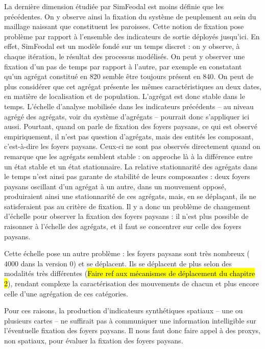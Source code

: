 La dernière dimension étudiée par SimFeodal est moins définie que les précédentes.
On y observe ainsi la fixation du système de peuplement au sein du maillage naissant que constituent les paroisses.
Cette notion de fixation pose problème par rapport à l'ensemble des indicateurs de sortie déployés jusqu'ici.
En effet, SimFeodal est un modèle fondé sur un temps discret :
on y observe, à chaque itération, le résultat des processus modélisés.
On peut y observer une fixation d'un pas de temps par rapport à l'autre, par exemple en constatant qu'un agrégat constitué en 820 semble être toujours présent en 840.
On peut de plus considérer que cet agrégat présente les mêmes caractéristiques au deux dates, en matière de localisation et de population.
L'agrégat est donc stable dans le temps.
L'échelle d'analyse mobilisée dans les indicateurs précédents -- au niveau agrégé des agrégats, voir du système d'agrégats -- pourrait donc s'appliquer ici aussi.
Pourtant, quand on parle de fixation des foyers paysans, ce qui est observé empiriquement, il n'est pas question d'agrégats, mais des entités les composant, c'est-à-dire les foyers paysans.
Ceux-ci ne sont pas observés directement quand on remarque que les agrégats semblent stable :
on approche là à la différence entre un état stable et un état stationnaire.
La relative stationnarité des agrégats dans le temps n'est ainsi pas garante de stabilité de leurs composantes :
deux foyers paysans oscillant d'un agrégat à un autre, dans un mouvement opposé, produiraient ainsi une stationnarité de ces agrégats, mais, en se déplaçant, ils ne satisferaient pas au critère de fixation.
Il y a donc un problème de changement d'échelle pour observer la fixation des foyers paysans :
il n'est plus possible de raisonner à l'échelle des agrégats, et il faut se concentrer sur celle des foyers paysans.

Cette échelle pose un autre problème :
les foyers paysans sont très nombreux ($4000$ dans la version 0) et se déplacent.
Ils se déplacent de plus selon des modalités très différentes (\hl{Faire ref aux mécanismes de déplacement du chapitre 2}), rendant complexe la caractérisation des mouvements de chacun et plus encore celle d'une agrégation de ces catégories.

Pour ces raisons, la production d'indicateurs synthétiques spatiaux -- une ou plusieurs cartes -- ne suffirait pas à communiquer une information intelligible sur l'éventuelle fixation des foyers paysans.
Il nous faut donc faire appel à des \og proxys\fg{}, non spatiaux, pour évaluer la fixation des foyers paysans.

